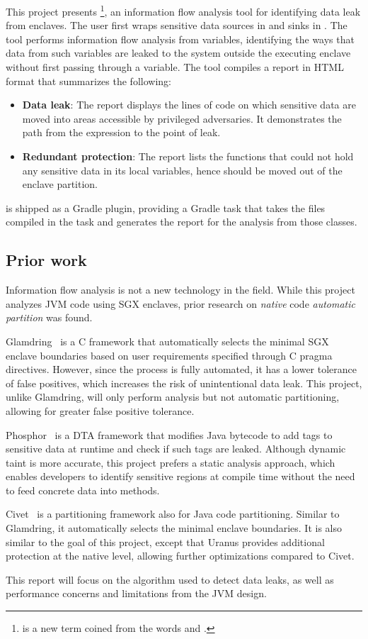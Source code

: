 This project presents \pname{}
\footnote{ is a new term coined from the words  and .},
an information flow analysis tool
for identifying data leak from enclaves.
The user first wraps sensitive data sources in  and sinks in .
The tool performs information flow analysis from  variables,
identifying the ways that data from such variables are leaked
to the system outside the executing enclave
without first passing through a  variable.
The tool compiles a report in HTML format that summarizes the following:
\begin{itemize}
	\item \textbf{Data leak}:
		The report displays the lines of code on which sensitive data are moved
		into areas accessible by privileged adversaries.
		It demonstrates the path from the  expression to the point of leak.
	\item \textbf{Redundant protection}:
		The report lists the functions that could not hold any sensitive data in its local variables,
		hence should be moved out of the enclave partition.
\end{itemize}

\pname{} is shipped as a Gradle plugin,
providing a Gradle task that
takes the  files compiled in the  task
and generates the report for the analysis from those classes.

\subsection{Prior work}\label{subsec:prior-art}
Information flow analysis is not a new technology in the field.
While this project analyzes \ac{JVM} code using \ac{SGX} enclaves,
prior research on \emph{native} code \emph{automatic partition} was found.

Glamdring~\cite{glamdring} is a C framework that
automatically selects the minimal \ac{SGX} enclave boundaries
based on user requirements specified through C pragma directives.
However, since the process is fully automated,
it has a lower tolerance of false positives,
which increases the risk of unintentional data leak.
This project, unlike Glamdring, will only perform analysis but not automatic partitioning,
allowing for greater false positive tolerance.

Phosphor~\cite{BellJonathan2014Pidd} is a \ac{DTA} framework
that modifies Java bytecode to add tags to sensitive data at runtime
and check if such tags are leaked.
Although dynamic taint is more accurate,
this project prefers a static analysis approach,
which enables developers to identify sensitive regions at compile time
without the need to feed concrete data into methods.

Civet~\cite{civet} is a partitioning framework also for Java code partitioning.
Similar to Glamdring, it automatically selects the minimal enclave boundaries.
It is also similar to the goal of this project,
except that Uranus provides additional protection at the native level,
allowing further optimizations compared to Civet.

This report will focus on the algorithm used to detect data leaks,
as well as performance concerns and limitations from the \ac{JVM} design.
